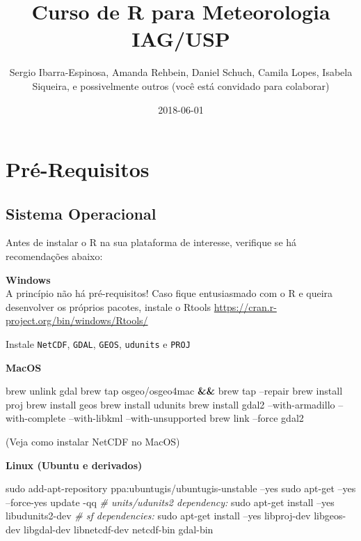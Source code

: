 \documentclass[]{book}
\title{Curso de R para Meteorologia IAG/USP}
\author{Sergio Ibarra-Espinosa, Amanda Rehbein, Daniel Schuch, Camila Lopes,
Isabela Siqueira, e possivelmente outros (você está convidado para
colaborar)}
\date{2018-06-01}
\newenvironment{Shaded}{\begin{snugshade}}{\end{snugshade}}
\newcommand{\KeywordTok}[1]{\textcolor[rgb]{0.13,0.29,0.53}{\textbf{#1}}}
\newcommand{\CommentTok}[1]{\textcolor[rgb]{0.56,0.35,0.01}{\textit{#1}}}
\newcommand{\FunctionTok}[1]{\textcolor[rgb]{0.00,0.00,0.00}{#1}}
\newcommand{\ExtensionTok}[1]{#1}
\newcommand{\NormalTok}[1]{#1}
\theoremstyle{definition}
\theoremstyle{definition}
\theoremstyle{definition}
\theoremstyle{remark}
\begin{document}
\maketitle

{
\setcounter{tocdepth}{1}
\tableofcontents
}
\chapter{Pré-Requisitos}\label{primero}

\section{Sistema Operacional}\label{sistema-operacional}

Antes de instalar o R na sua plataforma de interesse, verifique se há
recomendações abaixo:

\textbf{Windows}\\
A princípio não há pré-requisitos! Caso fique entusiasmado com o R e
queira desenvolver os próprios pacotes, instale o Rtools
\url{https://cran.r-project.org/bin/windows/Rtools/}

Instale \texttt{NetCDF}, \texttt{GDAL}, \texttt{GEOS}, \texttt{udunits}
e \texttt{PROJ}

\textbf{MacOS}

\begin{Shaded}
\begin{Highlighting}[]
\ExtensionTok{brew}\NormalTok{ unlink gdal}
\ExtensionTok{brew}\NormalTok{ tap osgeo/osgeo4mac }\KeywordTok{&&} \ExtensionTok{brew}\NormalTok{ tap --repair}
\ExtensionTok{brew}\NormalTok{ install proj}
\ExtensionTok{brew}\NormalTok{ install geos}
\ExtensionTok{brew}\NormalTok{ install udunits}
\ExtensionTok{brew}\NormalTok{ install gdal2 --with-armadillo --with-complete --with-libkml --with-unsupported}
\ExtensionTok{brew}\NormalTok{ link --force gdal2}
\end{Highlighting}
\end{Shaded}

(Veja como instalar NetCDF no MacOS)

\textbf{Linux (Ubuntu e derivados)}

\begin{Shaded}
\begin{Highlighting}[]
\FunctionTok{sudo}\NormalTok{ add-apt-repository ppa:ubuntugis/ubuntugis-unstable --yes}
\FunctionTok{sudo}\NormalTok{ apt-get --yes --force-yes update -qq}
\CommentTok{# units/udunits2 dependency:}
\FunctionTok{sudo}\NormalTok{ apt-get install --yes libudunits2-dev}
\CommentTok{# sf dependencies:}
\FunctionTok{sudo}\NormalTok{ apt-get install --yes libproj-dev libgeos-dev libgdal-dev libnetcdf-dev  netcdf-bin gdal-bin}
\end{Highlighting}
\end{Shaded}
\end{document}
